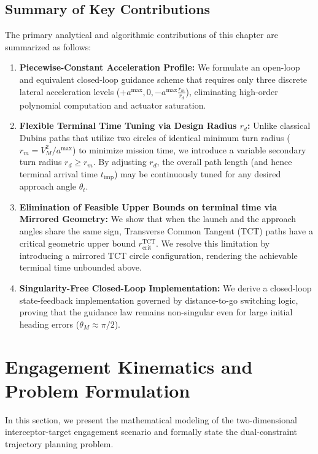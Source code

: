 \subsection*{Summary of Key Contributions}
The primary analytical and algorithmic contributions of this chapter are summarized as follows:
\begin{enumerate}
    \item \textbf{Piecewise-Constant Acceleration Profile:} We formulate an open-loop and equivalent closed-loop guidance scheme that requires only three discrete lateral acceleration levels ($+a^{\max}, 0, -a^{\max} \frac{r_m}{r_d}$), eliminating high-order polynomial computation and actuator saturation.
    \item \textbf{Flexible Terminal Time Tuning via Design Radius $r_d$:} Unlike classical Dubins paths \cite{hota2009modified} that utilize two circles of identical minimum turn radius ($r_m = V_M^2 / a^{\max}$) to minimize mission time, we introduce a variable secondary turn radius $r_d \ge r_m$. By adjusting $r_d$, the overall path length (and hence terminal arrival time $t_{\text{imp}}$) may be continuously tuned for any desired approach angle $\theta_t$.
    \item \textbf{Elimination of Feasible Upper Bounds on terminal time via Mirrored Geometry:} We show that when the launch and the approach angles share the same sign, Transverse Common Tangent (TCT) paths have a critical geometric upper bound $r_{\text{crit}}^{\text{TCT}}$. We resolve this limitation by introducing a mirrored TCT circle configuration, rendering the achievable terminal time unbounded above.
    \item \textbf{Singularity-Free Closed-Loop Implementation:} We derive a closed-loop state-feedback implementation governed by distance-to-go switching logic, proving that the guidance law remains non-singular even for large initial heading errors ($\theta_M \approx \pi/2$).
\end{enumerate}

\section{Engagement Kinematics and Problem Formulation}\label{sec:ch_DP_probform}

In this section, we present the mathematical modeling of the two-dimensional interceptor-target engagement scenario and formally state the dual-constraint trajectory planning problem. 

